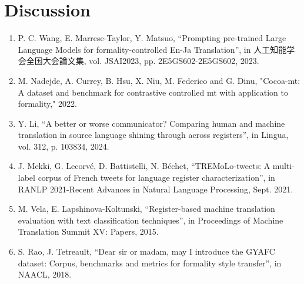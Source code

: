 \documentclass[fleqn,moreauthors,10pt]{ds_report}
\begin{document}
	
	
	
	
	
	\section*{Discussion}
	
	
	
	
	
	
	
	
	
	\renewcommand{\labelenumi}{[\theenumi]}
	\begin{enumerate}
		\item  P. C. Wang, E. Marrese-Taylor, Y. Matsuo, “Prompting pre-trained Large Language Models for formality-controlled En-Ja Translation”, in 人工知能学会全国大会論文集, vol. JSAI2023, pp. 2E5GS602-2E5GS602, 2023.
		\item M. Nadejde, A. Currey, B. Hsu, X. Niu, M. Federico and G. Dinu, "Cocoa-mt: A dataset and benchmark for contrastive controlled mt with application to formality," 2022.
		\item Y. Li, “A better or worse communicator? Comparing human and machine translation in source language shining through across registers”, in Lingua, vol. 312, p. 103834, 2024.
		\item J. Mekki, G. Lecorvé, D. Battistelli, N. Béchet, “TREMoLo-tweets: A multi-label corpus of French tweets for language register characterization”, in RANLP 2021-Recent Advances in Natural Language Processing, Sept. 2021.
		\item M. Vela, E. Lapshinova-Koltunski, “Register-based machine translation evaluation with text classification techniques”, in Proceedings of Machine Translation Summit XV: Papers, 2015.
		\item  S. Rao, J. Tetreault, “Dear sir or madam, may I introduce the GYAFC dataset: Corpus, benchmarks and metrics for formality style transfer”, in NAACL, 2018.
	\end{enumerate}
	
	
\end{document}
